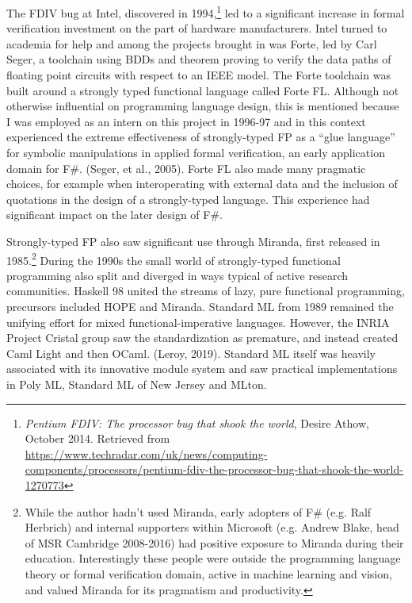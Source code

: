 \documentclass[acmsmall,review]{acmart}\settopmatter{printfolios=true,printccs=false,printacmref=false}
\begin{document}
The FDIV bug at Intel, discovered in 1994,\footnote{\textit{Pentium FDIV: The processor bug that shook the world}, Desire Athow, October 2014. Retrieved from \url{https://www.techradar.com/uk/news/computing-components/processors/pentium-fdiv-the-processor-bug-that-shook-the-world-1270773}}  led to a significant increase in formal verification investment on the part of hardware manufacturers. Intel turned to academia for help and among the projects brought in was Forte, led by Carl Seger, a toolchain using BDDs and theorem proving to verify the data paths of floating point circuits with respect to an IEEE model.  The Forte toolchain was built around a strongly typed functional language called Forte FL. Although not otherwise influential on programming language design, this is mentioned because I was employed as an intern on this project in 1996-97 and in this context experienced the extreme effectiveness of strongly-typed FP as a “glue language” for symbolic manipulations in applied formal verification, an early application domain for F\#. (Seger, et al., 2005). Forte FL also made many pragmatic choices, for example when interoperating with external data and the inclusion of quotations in the design of a strongly-typed language. This experience had significant impact on the later design of F\#.

Strongly-typed FP also saw significant use through Miranda, first released in 1985.\footnote{While the author hadn’t used Miranda, early adopters of F\# (e.g. Ralf Herbrich) and internal supporters within Microsoft (e.g. Andrew Blake, head of MSR Cambridge 2008-2016) had positive exposure to Miranda during their education. Interestingly these people were outside the programming language theory or formal verification domain, active in machine learning and vision, and valued Miranda for its pragmatism and productivity.}  During the 1990s the small world of strongly-typed functional programming also split and diverged in ways typical of active research communities.  Haskell 98 united the streams of lazy, pure functional programming, precursors included HOPE and Miranda.  Standard ML from 1989 remained the unifying effort for mixed functional-imperative languages. However, the INRIA Project Cristal group saw the standardization as premature, and instead created Caml Light and then OCaml. (Leroy, 2019). Standard ML itself was heavily associated with its innovative module system and saw practical implementations in Poly ML, Standard ML of New Jersey and MLton.
\end{document}
